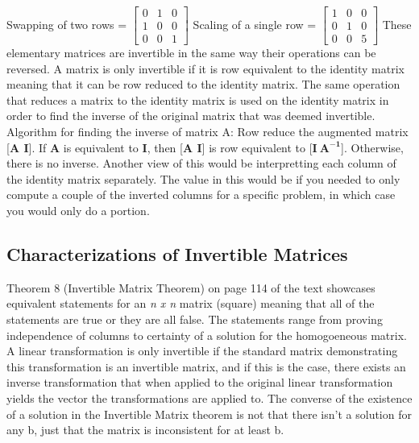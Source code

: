 \documentclass[12pt]{article}
\begin{document}
\newline
\newline
\newline
Swapping of two rows = $\begin{bmatrix}
    0 & 1 & 0 \\
    1 & 0 & 0 \\
    0 & 0 & 1
\end{bmatrix}$
\newline
\newline
\newline
Scaling of a single row = $\begin{bmatrix}
    1 & 0 & 0 \\
    0 & 1 & 0 \\
    0 & 0 & 5
\end{bmatrix}$
\newline
\newline
\newline
These elementary matrices are invertible in the same way their operations can be reversed. A matrix is only invertible if it is row equivalent to the identity matrix %
meaning that it can be row reduced to the identity matrix. The same operation that reduces a matrix to the identity matrix is used on the identity matrix in order to %
find the inverse of the original matrix that was deemed invertible. 
\newline
\newline
Algorithm for finding the inverse of matrix A: Row reduce the augmented matrix [\textbf{A I}]. If \textbf{A} is equivalent to \textbf{I}, then [\textbf{A I}] %
is row equivalent to [$\mathbf{I\medspace A^{-1}}$]. Otherwise, there is no inverse. Another view of this would be interpretting each column of the identity matrix %
separately. The value in this would be if you needed to only compute a couple of the inverted columns for a specific problem, in which case you would only do a portion. 
\subsection{Characterizations of Invertible Matrices}
Theorem 8 (Invertible Matrix Theorem) on page 114 of the text showcases equivalent statements for an \textit{n x n} matrix (square) meaning that all of the statements %
are true or they are all false. The statements range from proving independence of columns to certainty of a solution for the homogoeneous matrix. A linear transformation %
is only invertible if the standard matrix demonstrating this transformation is an invertible matrix, and if this is the case, there exists an inverse transformation %
that when applied to the original linear transformation yields the vector the transformations are applied to. The converse of the existence of a solution in the Invertible %
Matrix theorem is not that there isn't a solution for any b, just that the matrix is inconsistent for at least b. 
\end{document}
